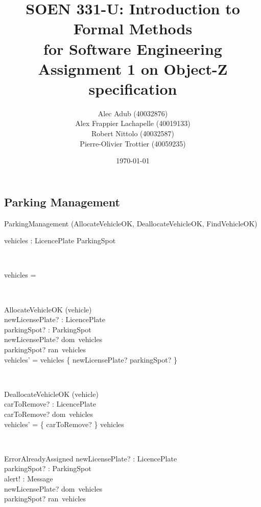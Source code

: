 \documentclass[12pt]{article}
\title{SOEN 331-U: Introduction to Formal Methods\\for Software Engineering\\
Assignment 1 on Object-Z specification}
\author{\begin{tabular}{c}
Alec Adub (40032876) \tabularnewline
Alex Frappier Lachapelle (40019133) \tabularnewline
Robert Nittolo (40032587) \tabularnewline
Pierre-Olivier Trottier (40059235) \tabularnewline\\
\end{tabular}
}
\date{\today}
\begin{document}
\begin{spacing}{1.5}

\maketitle

\newpage

\section{Parking Management}

\begin{class}{ParkingManagement}
\also
\upharpoonright (AllocateVehicleOK, DeallocateVehicleOK, FindVehicleOK) \\
\begin{state}
vehicles : LicencePlate  \rightarrowtail ParkingSpot\\
\where
\end{state} \\
\begin{init}
vehicles = \emptyset %
\end{init} \\
\begin{op}{AllocateVehicleOK}
\Delta (vehicle) \\
newLicensePlate? : LicencePlate\\
parkingSpot? : ParkingSpot\\
\ST
newLicensePlate? \notin dom~vehicles\\
parkingSpot? \notin ran~vehicles\\
vehicles' = vehicles \union \{ newLicensePlate? \rightarrowtail parkingSpot? \}
\end{op}\\
\begin{op}{DeallocateVehicleOK}
\Delta (vehicle) \\
carToRemove? : LicencePlate\\
\ST
carToRemove? \in dom~vehicles\\
vehicles' = \{ carToRemove? \} \ndres vehicles
\end{op}\\
\begin{op}{ErrorAlreadyAssigned}
newLicensePlate? : LicencePlate\\
parkingSpot? : ParkingSpot\\
alert! : Message\\
\ST
newLicensePlate? \in dom~vehicles\\
parkingSpot? \in ran~vehicles\\

\end{op}
\end{class}
\end{spacing}
\end{document}
